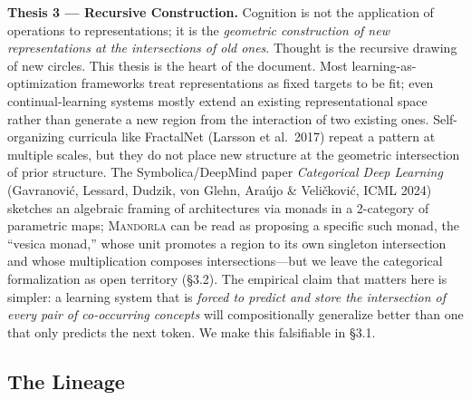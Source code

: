 \documentclass[11pt,a4paper]{article}
\begin{document}
\textbf{Thesis 3 --- Recursive Construction.} Cognition is not the application of operations to representations; it is the \emph{geometric construction of new representations at the intersections of old ones}. Thought is the recursive drawing of new circles. This thesis is the heart of the document. Most learning-as-optimization frameworks treat representations as fixed targets to be fit; even continual-learning systems mostly extend an existing representational space rather than generate a new region from the interaction of two existing ones. Self-organizing curricula like FractalNet (Larsson et al.\ 2017) repeat a pattern at multiple scales, but they do not place new structure at the geometric intersection of prior structure. The Symbolica/DeepMind paper \emph{Categorical Deep Learning} (Gavranovi\'c, Lessard, Dudzik, von Glehn, Ara\'ujo \& Veli\v{c}kovi\'c, ICML 2024) sketches an algebraic framing of architectures via monads in a 2-category of parametric maps; \textsc{Mandorla} can be read as proposing a specific such monad, the ``vesica monad,'' whose unit promotes a region to its own singleton intersection and whose multiplication composes intersections---but we leave the categorical formalization as open territory (\S 3.2). The empirical claim that matters here is simpler: a learning system that is \emph{forced to predict and store the intersection of every pair of co-occurring concepts} will compositionally generalize better than one that only predicts the next token. We make this falsifiable in \S 3.1.

\subsection{The Lineage}
\end{document}
